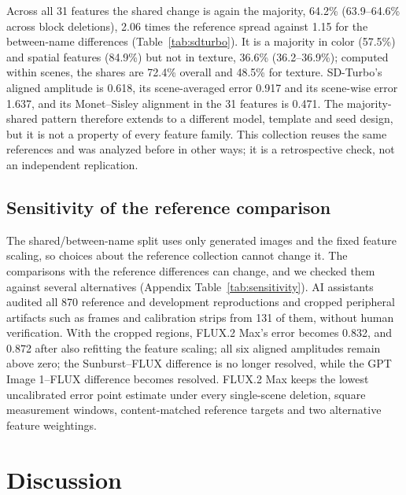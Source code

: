 \documentclass[10pt]{article}
\begin{document}
Across all 31 features the shared change is again the majority, 64.2\% (63.9--64.6\%
across block deletions), 2.06 times the reference spread against 1.15 for the
between-name differences (Table~\ref{tab:sdturbo}). It is a majority in color
(57.5\%) and spatial features (84.9\%) but not in texture, 36.6\% (36.2--36.9\%);
computed within scenes, the shares are 72.4\% overall and 48.5\% for texture.
SD-Turbo's aligned amplitude is 0.618, its scene-averaged error 0.917 and its
scene-wise error 1.637, and its Monet--Sisley alignment in the 31 features is
0.471. The majority-shared pattern therefore extends to a different model, template
and seed design, but it is not a property of every feature family. This collection
reuses the same references and was analyzed before in other ways; it is a
retrospective check, not an independent replication.

\subsection{Sensitivity of the reference comparison}\label{sec:sensitivity}

The shared/between-name split uses only generated images and the fixed feature
scaling, so choices about the reference collection cannot change it. The comparisons
with the reference differences can change, and we checked them against several
alternatives (Appendix Table~\ref{tab:sensitivity}). AI assistants audited all 870
reference and development reproductions and cropped peripheral artifacts such as
frames and calibration strips from 131 of them, without human verification. With
the cropped regions, FLUX.2 Max's error becomes 0.832, and 0.872 after also refitting
the feature scaling; all six aligned amplitudes remain above zero; the Sunburst--FLUX
difference is no longer resolved, while the GPT Image 1--FLUX difference becomes
resolved. FLUX.2 Max keeps the lowest uncalibrated error point estimate under every
single-scene deletion, square measurement windows, content-matched reference
targets and two alternative feature weightings.

\section{Discussion}\label{sec:discussion}
\end{document}
